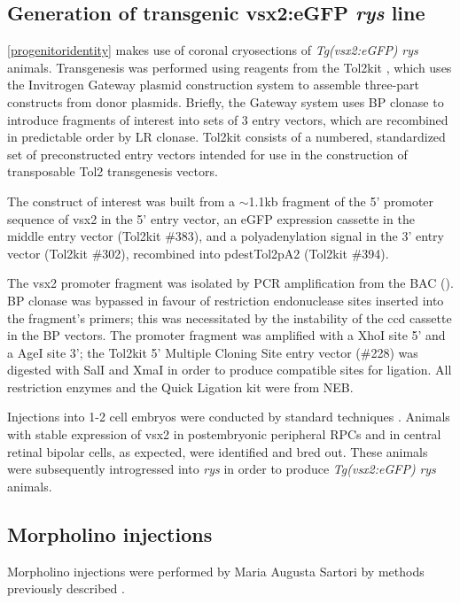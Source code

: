 \documentclass{ut-thesis}
\begin{document}
\begin{NoHyper}
\subsection{Generation of transgenic vsx2:eGFP \textit{rys} line}
\autoref{progenitoridentity} makes use of coronal cryosections of \textit{Tg(vsx2:eGFP)} \textit{rys} animals. Transgenesis was performed using reagents from the Tol2kit \cite{Kwan2007}, which uses the Invitrogen Gateway plasmid construction system to assemble three-part constructs from donor plasmids. Briefly, the Gateway system uses BP clonase to introduce fragments of interest into sets of 3 entry vectors, which are recombined in predictable order by LR clonase. Tol2kit consists of a numbered, standardized set of preconstructed entry vectors intended for use in the construction of transposable Tol2 transgenesis vectors.

The construct of interest was built from a $\sim$1.1kb fragment of the 5' promoter sequence of vsx2 in the 5' entry vector, an eGFP expression cassette in the middle entry vector (Tol2kit \#383), and a polyadenylation signal in the 3' entry vector (Tol2kit \#302), recombined into pdestTol2pA2 (Tol2kit \#394).

The vsx2 promoter fragment was isolated by PCR amplification from the BAC (). BP clonase was bypassed in favour of restriction endonuclease sites inserted into the fragment's primers; this was necessitated by the instability of the ccd cassette in the BP vectors. The promoter fragment was amplified with a XhoI site 5' and a AgeI site 3'; the Tol2kit 5' Multiple Cloning Site entry vector (\#228) was digested with SalI and XmaI in order to produce compatible sites for ligation. All restriction enzymes and the Quick Ligation kit were from NEB.

Injections into 1-2 cell embryos were conducted by standard techniques \cite{Westerfield2000}. Animals with stable expression of vsx2 in postembryonic peripheral RPCs and in central retinal bipolar cells, as expected, were identified and bred out. These animals were subsequently introgressed into \textit{rys} in order to produce \textit{Tg(vsx2:eGFP)} \textit{rys} animals.

\subsection{Morpholino injections}
\label{ssec:moinjxn}
Morpholino injections were performed by Maria Augusta Sartori by methods previously described \cite{Wong2015a}.


\end{NoHyper}
\end{document}
